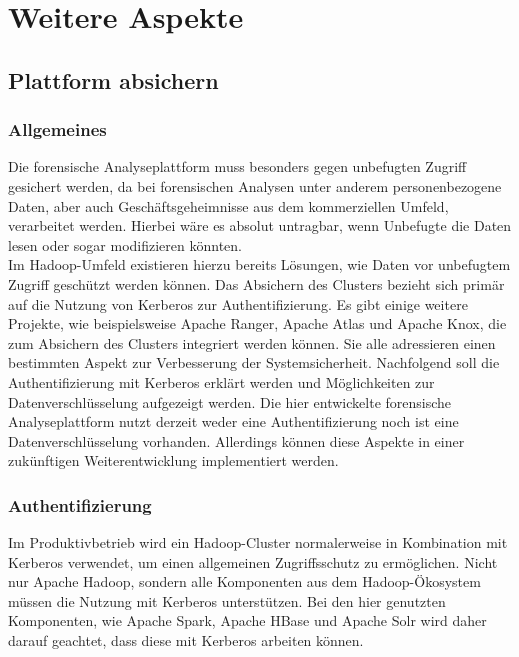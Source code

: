 \chapter{Weitere Aspekte}
\label{ch:additional_aspects}

\section{Plattform absichern}
\label{sec:secure_platform}
\subsection{Allgemeines}
Die forensische Analyseplattform muss besonders gegen unbefugten Zugriff gesichert werden, da bei forensischen Analysen unter anderem personenbezogene Daten, aber auch Geschäftsgeheimnisse aus dem kommerziellen Umfeld, verarbeitet werden. Hierbei wäre es absolut untragbar, wenn Unbefugte die Daten lesen oder sogar modifizieren könnten.\\

\noindent
Im Hadoop-Umfeld existieren hierzu bereits Lösungen, wie Daten vor unbefugtem Zugriff geschützt werden können. Das Absichern des Clusters bezieht sich primär auf die Nutzung von Kerberos zur Authentifizierung. Es gibt einige weitere Projekte, wie beispielsweise Apache Ranger, Apache Atlas und Apache Knox, die zum Absichern des Clusters integriert werden können. Sie alle adressieren einen bestimmten Aspekt zur Verbesserung der Systemsicherheit. Nachfolgend soll die Authentifizierung mit Kerberos erklärt werden und Möglichkeiten zur Datenverschlüsselung aufgezeigt werden. Die hier entwickelte forensische Analyseplattform nutzt derzeit weder eine Authentifizierung noch ist eine Datenverschlüsselung vorhanden. Allerdings können diese Aspekte in einer zukünftigen Weiterentwicklung implementiert werden.

\subsection{Authentifizierung}

Im Produktivbetrieb wird ein Hadoop-Cluster normalerweise in Kombination mit Kerberos verwendet, um einen allgemeinen Zugriffsschutz zu ermöglichen.\cite{hadoop_security} Nicht nur Apache Hadoop, sondern alle Komponenten aus dem Hadoop-Ökosystem müssen die Nutzung mit Kerberos unterstützen. Bei den hier genutzten Komponenten, wie Apache Spark, Apache HBase und Apache Solr wird daher darauf geachtet, dass diese mit Kerberos arbeiten können.\\

